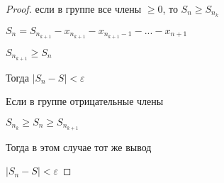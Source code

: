 \begin{theorem}
\begin{enumerate}
\begin{proof}
				если в группе все члены $\ge 0$, то $S_n \ge S_{n_k}$
		
				$S_n = S_{n_{k+1}} - x_{n_{k+1}} - x_{n_{k+1} - 1} - ... - x_{n+1}$
		
				$S_{n_{k+1}} \ge S_n$
		
				Тогда $|S_n - S| < \varepsilon$
		
				Если в группе отрицательные члены
		
				$S_{n_k} \ge S_n \ge S_{n_{k+1}}$
		
				Тогда в этом случае тот же вывод

				$|S_n - S| < \varepsilon$

			\end{proof}
	\end{enumerate}

\end{theorem}